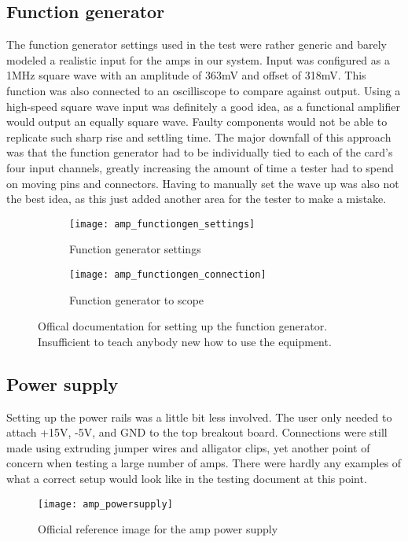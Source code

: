 \subsection{Function generator}
The function generator settings used in the test were rather generic and barely modeled a realistic input for the amps in our system. Input was configured as a 1MHz square wave with an amplitude of 363mV and offset of 318mV. This function was also connected to an oscilliscope to compare against output. Using a high-speed square wave input was definitely a good idea, as a functional amplifier would output an equally square wave. Faulty components would not be able to replicate such sharp rise and settling time. The major downfall of this approach was that the function generator had to be individually tied to each of the card's four input channels, greatly increasing the amount of time a tester had to spend on moving pins and connectors. Having to manually set the wave up was also not the best idea, as this just added another area for the tester to make a mistake.
\begin{figure}[!htb]
	\centering
	\begin{subfigure}[b]{0.43\textwidth}
		\texttt{[image: amp\_functiongen\_settings]}
		\centering
		\caption{Function generator settings}
		\centering
	\end{subfigure}
	\hfill
	\begin{subfigure}[b]{0.5\textwidth}
		\texttt{[image: amp\_functiongen\_connection]}
		\centering
		\caption{Function generator to scope}
		\centering
	\end{subfigure}
	\caption{Offical documentation for setting up the function generator. Insufficient to teach anybody new how to use the equipment.}
\end{figure}
\subsection{Power supply}
Setting up the power rails was a little bit less involved. The user only needed to attach +15V, -5V, and GND to the top breakout board. Connections were still made using extruding jumper wires and alligator clips, yet another point of concern when testing a large number of amps. There were hardly any examples of what a correct setup would look like in the testing document at this point.
\begin{figure}[!htb]
	\centering
	\texttt{[image: amp\_powersupply]}
	\caption{Official reference image for the amp power supply}
\end{figure}
